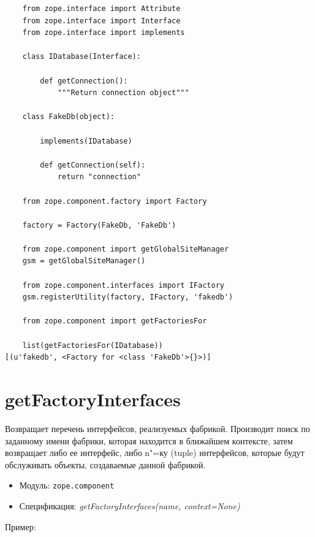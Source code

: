 \documentclass[a4paper,openany,twoside,final]{book}
\providecommand*{\DUroletitlereference}[1]{\textsl{#1}}
\begin{document}
\begin{verbatim}
    from zope.interface import Attribute
    from zope.interface import Interface
    from zope.interface import implements

    class IDatabase(Interface):

        def getConnection():
            """Return connection object"""

    class FakeDb(object):

        implements(IDatabase)

        def getConnection(self):
            return "connection"

    from zope.component.factory import Factory

    factory = Factory(FakeDb, 'FakeDb')

    from zope.component import getGlobalSiteManager
    gsm = getGlobalSiteManager()

    from zope.component.interfaces import IFactory
    gsm.registerUtility(factory, IFactory, 'fakedb')

    from zope.component import getFactoriesFor

    list(getFactoriesFor(IDatabase))
[(u'fakedb', <Factory for <class 'FakeDb'>{}>)]
\end{verbatim}


\section*{getFactoryInterfaces%
  \label{getfactoryinterfaces}%
}

Возвращает перечень интерфейсов, реализуемых фабрикой.  Производит поиск по заданному имени фабрики, которая находится в ближайшем контексте, затем возвращает либо ее интерфейс, либо n"=ку (tuple) интерфейсов, которые будут обслуживать объекты, создаваемые данной фабрикой.

\begin{itemize}

\item Модуль: \texttt{zope.component}

\item Спецификация: \DUroletitlereference{getFactoryInterfaces(name, context=None)}

\end{itemize}

Пример:
\end{document}
